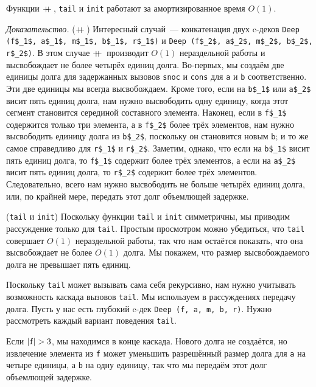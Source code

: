 \begin{theorem}\label{th:11.2}
  Функции $+\!\!\!+\,$, \lstinline!tail! и \lstinline!init! работают за
  амортизированное время $O(1)$.

  \noindent
  \emph{Доказательство.} ($+\!\!\!+\,$) Интересный случай~---
  конкатенация двух c-деков 
  \lstinline!Deep (f$_1$, a$_1$, m$_1$, b$_1$, r$_1$)! и
  \lstinline!Deep (f$_2$, a$_2$, m$_2$, b$_2$, r$_2$)!.
  В этом случае $+\!\!\!+\,$ производит $O(1)$ нераздельной работы и
  высвобождает не более четырёх единиц долга. Во-первых, мы создаём
  две единицы долга для задержанных вызовов \lstinline!snoc! и
  \lstinline!cons! для \lstinline!a! и \lstinline!b!
  соответственно. Эти две единицы мы всегда высвобождаем. Кроме того,
  если на \lstinline!b$_1$! или \lstinline!a$_2$! висит пять единиц
  долга, нам нужно высвободить одну единицу, когда этот сегмент
  становится серединой составного элемента.  Наконец, если в
  \lstinline!f$_1$! содержится только три элемента, а в
  \lstinline!f$_2$! более трёх элементов, нам нужно высвободить
  единицу долга из \lstinline!b$_2$!, поскольку он становится новым
  \lstinline!b!; и то же самое справедливо для \lstinline!r$_1$! и
  \lstinline!r$_2$!. Заметим, однако, что если на \lstinline!b$_1$!
  висит пять единиц долга, то \lstinline!f$_1$! содержит более трёх
  элементов, а если на \lstinline!a$_2$! висит пять единиц долга, то
  \lstinline!r$_2$! содержит более трёх элементов. Следовательно,
  всего нам нужно высвободить не больше четырёх единиц
  долга, или, по крайней мере, передать этот долг объемлющей задержке.

  (\lstinline!tail! и \lstinline!init!) Поскольку функции
  \lstinline!tail! и \lstinline!init! симметричны, мы приводим
  рассуждение только для \lstinline!tail!. Простым просмотром можно
  убедиться, что \lstinline!tail! совершает $O(1)$ нераздельной
  работы, так что нам остаётся показать, что она высвобождает не более
  $O(1)$ долга. Мы покажем, что размер высвобождаемого долга не
  превышает пять единиц.

  Поскольку \lstinline!tail! может вызывать сама себя рекурсивно, нам
  нужно учитывать возможность каскада вызовов \lstinline!tail!. Мы
  используем в рассуждениях передачу долга. Пусть у нас есть глубокий
  c-дек \lstinline!Deep (f, a, m, b, r)!. Нужно рассмотреть каждый
  вариант поведения \lstinline!tail!.

  Если $|\lstinline!f!| > 3$, мы находимся в конце каскада. Нового
  долга не создаётся, но извлечение элемента из \lstinline!f! может
  уменьшить разрешённый размер долга для \lstinline!a! на четыре
  единицы, а \lstinline!b! на одну единицу, так что мы передаём этот
  долг объемлющей задержке.


\end{theorem}
